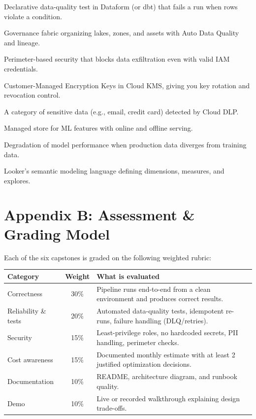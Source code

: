 \documentclass[11pt, a4paper]{article}
\begin{document}
\begin{description}[style=nextline]
    \item[Assertion] Declarative data-quality test in Dataform (or dbt) that fails a run when rows violate a condition.
    \item[Dataplex] Governance fabric organizing lakes, zones, and assets with Auto Data Quality and lineage.
    \item[VPC Service Controls] Perimeter-based security that blocks data exfiltration even with valid IAM credentials.
    \item[CMEK] Customer-Managed Encryption Keys in Cloud KMS, giving you key rotation and revocation control.
    \item[DLP InfoType] A category of sensitive data (e.g., email, credit card) detected by Cloud DLP.
    \item[Vertex AI Feature Store] Managed store for ML features with online and offline serving.
    \item[Model Drift] Degradation of model performance when production data diverges from training data.
    \item[LookML] Looker's semantic modeling language defining dimensions, measures, and explores.
\end{description}

\section{Appendix B: Assessment \& Grading Model}
Each of the six capstones is graded on the following weighted rubric:

\begin{center}
\renewcommand{\arraystretch}{1.4}
\begin{tabular}{@{} l c p{6.5cm} @{}}
\toprule
\textbf{Category} & \textbf{Weight} & \textbf{What is evaluated} \\
\midrule
Correctness & 30\% & Pipeline runs end-to-end from a clean environment and produces correct results. \\
Reliability \& tests & 20\% & Automated data-quality tests, idempotent re-runs, failure handling (DLQ/retries). \\
Security & 15\% & Least-privilege roles, no hardcoded secrets, PII handling, perimeter checks. \\
Cost awareness & 15\% & Documented monthly estimate with at least 2 justified optimization decisions. \\
Documentation & 10\% & README, architecture diagram, and runbook quality. \\
Demo & 10\% & Live or recorded walkthrough explaining design trade-offs. \\
\bottomrule
\end{tabular}
\end{center}
\end{document}
